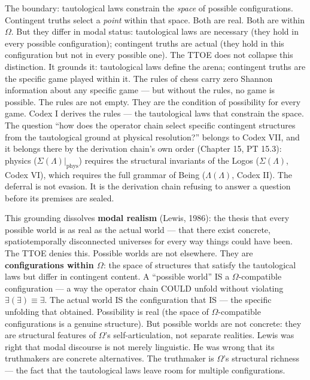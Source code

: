 \documentclass[10pt, openany, oneside]{book}
\begin{document}
The boundary: tautological laws constrain the \textit{space} of possible configurations. Contingent truths select a \textit{point} within that space. Both are real. Both are within $\Omega$. But they differ in modal status: tautological laws are necessary (they hold in every possible configuration); contingent truths are actual (they hold in this configuration but not in every possible one). The TTOE does not collapse this distinction. It grounds it: tautological laws define the arena; contingent truths are the specific game played within it. The rules of chess carry zero Shannon information about any specific game --- but without the rules, no game is possible. The rules are not empty. They are the condition of possibility for every game. Codex I derives the rules --- the tautological laws that constrain the space. The question ``how does the operator chain select specific contingent structures from the tautological ground at physical resolution?'' belongs to Codex VII, and it belongs there by the derivation chain's own order (Chapter 15, PT 15.3): physics ($\Sigma(\Lambda)|_{\text{phys}}$) requires the structural invariants of the Logos ($\Sigma(\Lambda)$, Codex VI), which requires the full grammar of Being ($\Lambda(\Lambda)$, Codex II). The deferral is not evasion. It is the derivation chain refusing to answer a question before its premises are sealed.

This grounding dissolves \textbf{modal realism} (Lewis, 1986): the thesis that every possible world is as real as the actual world --- that there exist concrete, spatiotemporally disconnected universes for every way things could have been. The TTOE denies this. Possible worlds are not elsewhere. They are \textbf{configurations within $\Omega$}: the space of structures that satisfy the tautological laws but differ in contingent content. A ``possible world'' IS a $\Omega$-compatible configuration --- a way the operator chain COULD unfold without violating $\exists(\exists) \equiv \exists$. The actual world IS the configuration that IS --- the specific unfolding that obtained. Possibility is real (the space of $\Omega$-compatible configurations is a genuine structure). But possible worlds are not concrete: they are structural features of $\Omega$'s self-articulation, not separate realities. Lewis was right that modal discourse is not merely linguistic. He was wrong that its truthmakers are concrete alternatives. The truthmaker is $\Omega$'s structural richness --- the fact that the tautological laws leave room for multiple configurations.
\end{document}
